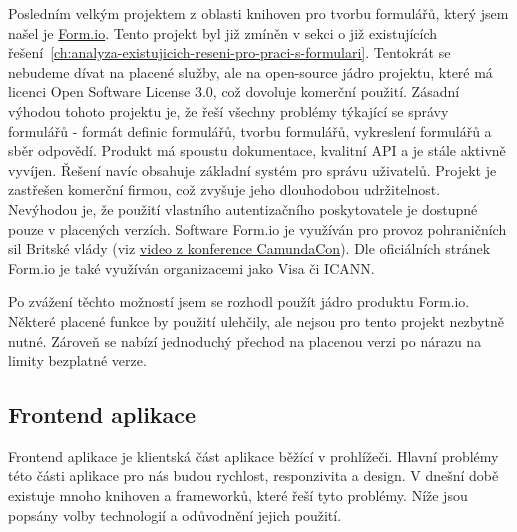 Posledním velkým projektem z oblasti knihoven pro tvorbu formulářů, který jsem našel je \href{https://form.io/}{Form.io}.
Tento projekt byl již zmíněn v sekci o již existujících řešení\ \ref{ch:analyza-existujicich-reseni-pro-praci-s-formulari}.
Tentokrát se nebudeme dívat na placené služby, ale na open-source jádro projektu, které má licenci Open Software License 3.0, což dovoluje komerční použití.
Zásadní výhodou tohoto projektu je, že řeší všechny problémy týkající se správy formulářů - formát definic formulářů, tvorbu formulářů, vykreslení formulářů a sběr odpovědí.
Produkt má spoustu dokumentace, kvalitní API a je stále aktivně vyvíjen.
Řešení navíc obsahuje základní systém pro správu uživatelů.
Projekt je zastřešen komerční firmou, což zvyšuje jeho dlouhodobou udržitelnost.
Nevýhodou je, že použití vlastního autentizačního poskytovatele je dostupné pouze v placených verzích.
Software Form.io je využíván pro provoz pohraničních sil Britské vlády (viz \href{https://www.youtube.com/watch?v=nuf46N5vU34}{video z konference CamundaCon}).
Dle oficiálních stránek Form.io je také využíván organizacemi jako Visa či ICANN\@.

Po zvážení těchto možností jsem se rozhodl použít jádro produktu Form.io.
Některé placené funkce by použití ulehčily, ale nejsou pro tento projekt nezbytně nutné.
Zároveň se nabízí jednoduchý přechod na placenou verzi po nárazu na limity bezplatné verze.

\subsection{Frontend aplikace}\label{subsec:frontend-aplikace}

Frontend aplikace je klientská část aplikace běžící v prohlížeči.
Hlavní problémy této části aplikace pro nás budou rychlost, responzivita a design.
V dnešní době existuje mnoho knihoven a frameworků, které řeší tyto problémy.
Níže jsou popsány volby technologií a odůvodnění jejich použití.

